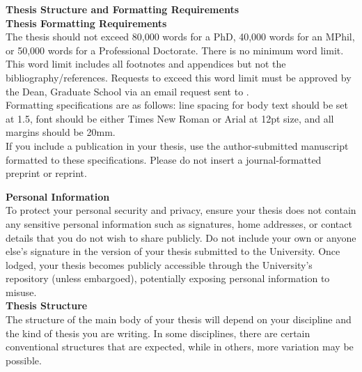 \clearpage
\begin{instructional}
\noindent
\textbf{\Large Thesis Structure and Formatting Requirements}\\

\noindent
\textbf{\large Thesis Formatting Requirements}\\

    \noindent
    The thesis should not exceed 80,000 words for a PhD, 40,000 words for an MPhil, or 50,000 words for a Professional Doctorate. There is no minimum word limit. This word limit includes all footnotes and appendices but not the bibliography/references. Requests to exceed this word limit must be approved by the Dean, Graduate School via an email request sent to \href{mailto:graduateschool@uq.edu.au}{\color{blue}{graduateschool@uq.edu.au}}.\\
    
    \noindent
    Formatting specifications are as follows: line spacing for body text should be set at 1.5, font should be either Times New Roman or Arial at 12pt size, and all margins should be 20mm.\\
    
    \noindent
    If you include a publication in your thesis, use the author-submitted manuscript formatted to these specifications.  Please do not insert a journal-formatted preprint or reprint.

\noindent
\textbf{\large Personal Information}\\
    
    \noindent
    To protect your personal security and privacy, ensure your thesis does not contain any sensitive personal information such as signatures, home addresses, or contact details that you do not wish to share publicly. Do not include your own or anyone else's signature in the version of your thesis submitted to the University. Once lodged, your thesis becomes publicly accessible through the University's repository (unless embargoed), potentially exposing personal information to misuse. \\

\noindent
\textbf{\large Thesis Structure}\\
    
    \noindent
    The structure of the main body of your thesis will depend on your discipline and the kind of thesis you are writing. In some disciplines, there are certain conventional structures that are expected, while in others, more variation may be possible.\\
    

\end{instructional}
